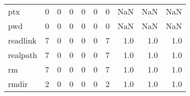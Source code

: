 \begin{longtable}{lrrrrrrrrr}
ptx       &                                                  0 &                                                  0 &                                                  0 &                                                  0 &                                                  0 &                                                  0 &                                                NaN &                                    NaN &                                  NaN \\
pwd       &                                                  0 &                                                  0 &                                                  0 &                                                  0 &                                                  0 &                                                  0 &                                                NaN &                                    NaN &                                  NaN \\
readlink  &                                                  7 &                                                  0 &                                                  0 &                                                  0 &                                                  0 &                                                  7 &                                                1.0 &                                    1.0 &                                  1.0 \\
realpath  &                                                  7 &                                                  0 &                                                  0 &                                                  0 &                                                  0 &                                                  7 &                                                1.0 &                                    1.0 &                                  1.0 \\
rm        &                                                  7 &                                                  0 &                                                  0 &                                                  0 &                                                  0 &                                                  7 &                                                1.0 &                                    1.0 &                                  1.0 \\
rmdir     &                                                  2 &                                                  0 &                                                  0 &                                                  0 &                                                  0 &                                                  2 &                                                1.0 &                                    1.0 &                                  1.0 \\

\end{longtable}
